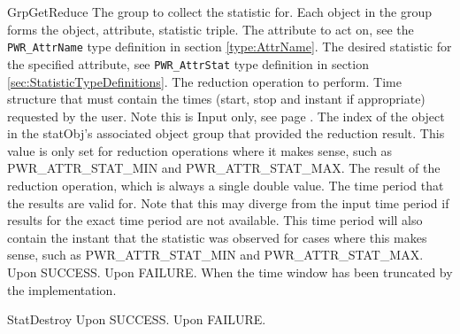 \begin{prototype}{GrpGetReduce}
			{\pInput}{The group to collect the statistic for. Each object in the group forms the object, attribute, statistic triple.}
			{\pInput}{The attribute to act on, see the \texttt{PWR_AttrName} type definition in section \ref{type:AttrName}.}
		{\pInput}{The desired statistic for the specified attribute, see \texttt{PWR_AttrStat} type definition in section \ref{sec:StatisticTypeDefinitions}.}
		{\pInput}{The reduction operation to perform.}
		{\pInput}{Time structure that must contain the times (start, stop and instant if appropriate) requested by the user. Note this is Input only, see page \pageref{type:TimePeriod}.}
				{\pOutput}{The index of the object in the statObj's associated object group that provided the reduction result. This value is only set for reduction operations where it makes sense, such as PWR_ATTR_STAT_MIN and PWR_ATTR_STAT_MAX.}
			{\pOutput}{The result of the reduction operation, which is always a single double value.}
		{\pOutput}{The time period that the results are valid for. Note that this may diverge from the input time period if results for the exact time period are not available. This time period will also contain the instant that the statistic was observed for cases where this makes sense, such as PWR_ATTR_STAT_MIN and PWR_ATTR_STAT_MAX.}
	 	{Upon SUCCESS.}
	 	{Upon FAILURE.}
	 	{When the time window has been truncated by the implementation.} 
\end{prototype}

\begin{prototype}{StatDestroy}
	 {Upon SUCCESS.}
	 {Upon FAILURE.}
\end{prototype}


